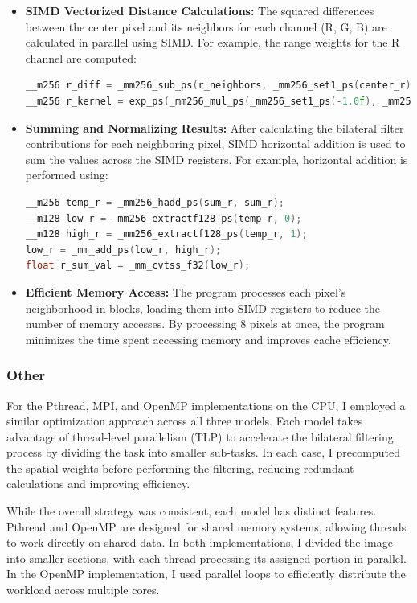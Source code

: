 \documentclass[12pt,a4paper]{report}
\begin{document}
\begin{itemize}
\item \textbf{SIMD Vectorized Distance Calculations:} The squared differences between the center pixel and its neighbors for each channel (R, G, B) are calculated in parallel using SIMD. For example, the range weights for the R channel are computed:
\begin{lstlisting}[language=c++]
__m256 r_diff = _mm256_sub_ps(r_neighbors, _mm256_set1_ps(center_r));
__m256 r_kernel = exp_ps(_mm256_mul_ps(_mm256_set1_ps(-1.0f), _mm256_mul_ps(r_diff, r_diff)));
\end{lstlisting}

\item \textbf{Summing and Normalizing Results:} After calculating the bilateral filter contributions for each neighboring pixel, SIMD horizontal addition is used to sum the values across the SIMD registers. For example, horizontal addition is performed using:
\begin{lstlisting}[language=c++]
__m256 temp_r = _mm256_hadd_ps(sum_r, sum_r);
__m128 low_r = _mm256_extractf128_ps(temp_r, 0);
__m128 high_r = _mm256_extractf128_ps(temp_r, 1);
low_r = _mm_add_ps(low_r, high_r);
float r_sum_val = _mm_cvtss_f32(low_r);
\end{lstlisting}

\item \textbf{Efficient Memory Access:} The program processes each pixel's neighborhood in blocks, loading them into SIMD registers to reduce the number of memory accesses. By processing 8 pixels at once, the program minimizes the time spent accessing memory and improves cache efficiency.
\end{itemize}


\subsubsection*{Other}
For the Pthread, MPI, and OpenMP implementations on the CPU, I employed a similar optimization approach across all three models. Each model takes advantage of thread-level parallelism (TLP) to accelerate the bilateral filtering process by dividing the task into smaller sub-tasks. In each case, I precomputed the spatial weights before performing the filtering, reducing redundant calculations and improving efficiency.

While the overall strategy was consistent, each model has distinct features. Pthread and OpenMP are designed for shared memory systems, allowing threads to work directly on shared data. In both implementations, I divided the image into smaller sections, with each thread processing its assigned portion in parallel. In the OpenMP implementation, I used parallel loops to efficiently distribute the workload across multiple cores. 
\end{document}

